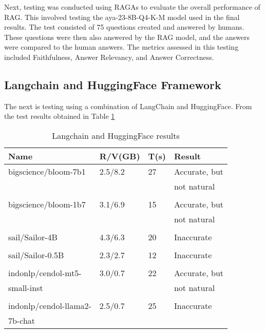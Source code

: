 Next, testing was conducted using RAGAs to evaluate the overall performance of RAG. This involved testing the aya-23-8B-Q4-K-M model used in the final results. The test consisted of 75 questions created and answered by humans. These questions were then also answered by the RAG model, and the answers were compared to the human answers. The metrics assessed in this testing included Faithfulness, Answer Relevancy, and Answer Correctness.

\subsection{Langchain and HuggingFace Framework }
The next is testing using a combination of LangChain and HuggingFace. From the test results obtained in Table  \ref{tab:hasilrag}
\begin{table}[!htbp]
  \caption{Langchain and HuggingFace results}
  \label{tab:hasilrag}
  \centering
  \begin{tabular}{llll}
    \toprule
    Name                      & R/V(GB) & T(s)  & Result \\
    \midrule
    bigscience/bloom-7b1      & 2.5/8.2    &27   & Accurate, but \\ \cite{muennighoff2022crosslingual}                          &          &           & not natural \\  
    \\
    bigscience/bloom-1b7
    \cite{muennighoff2022crosslingual}      & 3.1/6.9   &15    & Accurate, but \\
                              &          &           & not natural \\ 
    \\ 
    sail/Sailor-4B \cite{dou2024sailor}           & 4.3/6.3    &20   & Inaccurate \\
    \\
    sail/Sailor-0.5B \cite{dou2024sailor}          & 2.3/2.7   &12    & Inaccurate \\
    \\
    indonlp/cendol-mt5-       & 3.0/0.7  &22     & Accurate, but \\
    small-inst \cite{indonlp1,indonlp2, indonlp3, indonlp4, indonlp5, indonlp6, indonlp7}              &          &           & not natural \\ 
    \\
    indonlp/cendol-llama2-    & 2.5/0.7   &25      & Inaccurate \\
    7b-chat \cite{indonlp1,indonlp2, indonlp3, indonlp4, indonlp5, indonlp6, indonlp7}                  &          &           &  \\

\end{tabular}
\end{table}
